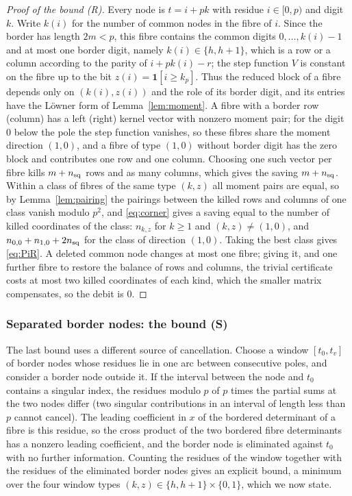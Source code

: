 \documentclass[11pt]{amsart}
\theoremstyle{definition}
\theoremstyle{remark}
\numberwithin{equation}{section}
\begin{document}
\begin{proof}[Proof of the bound (R)]
Every node is $t=i+pk$ with residue $i\in[0,p)$ and digit $k$. Write $k(i)$ for the number of common nodes in the fibre
of $i$. Since the border has length $2m<p$, this fibre contains the common digits $0,\dots,k(i)-1$ and at most one border
digit, namely $k(i)\in\{h,h+1\}$, which is a row or a column according to the parity of $i+pk(i)-r$; the step function
$V$ is constant on the fibre up to the bit $z(i)=\mathbf 1[i\ge k_p]$. Thus the reduced block of a fibre depends only
on $(k(i),z(i))$ and the role of its border digit, and its entries have the L\"owner form of Lemma~\ref{lem:moment}. A
fibre with a border row (column) has a left (right) kernel vector with nonzero moment pair; for the digit $0$ below the
pole the step function vanishes, so these fibres share the moment direction $(1,0)$, and a fibre of type $(1,0)$
without border digit has the zero block and contributes one row and one column. Choosing one such vector per fibre kills
$m+n_{\rm sq}$ rows and as many columns, which gives the saving $m+n_{\rm sq}$. Within a class of fibres of the same type
$(k,z)$ all moment pairs are equal, so by Lemma~\ref{lem:pairing} the pairings between the killed rows and columns of one
class vanish modulo $p^2$, and \eqref{eq:corner} gives a saving equal to the number of killed coordinates of the class:
$n_{k,z}$ for $k\ge1$ and $(k,z)\ne(1,0)$, and $n_{0,0}+n_{1,0}+2n_{\rm sq}$ for the class of direction $(1,0)$. Taking the
best class gives
\eqref{eq:PiR}. A deleted common node changes at most one fibre; giving it, and one further fibre to restore the
balance of rows and columns, the trivial certificate costs at most two killed coordinates of each kind, which the
smaller matrix compensates, so the debit is $0$.
\end{proof}

\subsubsection{Separated border nodes: the bound (S)}\label{ssec:sep}
The last bound uses a different source of cancellation. Choose a window $[t_0,t_v]$ of border nodes whose residues lie
in one arc between consecutive poles, and consider a border node outside it. If the interval between the node and
$t_0$ contains a singular index, the residues modulo $p$ of $p$ times the partial sums at the two nodes differ (two
singular contributions in an interval of length less than $p$ cannot cancel). The leading coefficient in $x$ of the
bordered determinant of a fibre is this residue, so the cross product of the two bordered fibre determinants has a
nonzero leading coefficient, and the border node is eliminated against $t_0$ with no further information. Counting the
residues of the window together with the residues of the eliminated border nodes gives an explicit bound, a minimum over
the four window types $(k,z)\in\{h,h+1\}\times\{0,1\}$, which we now state.
\end{document}
